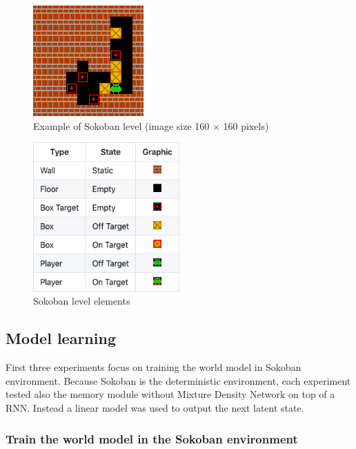 \begin{figure}[H]
\includegraphics[]{figures/Sokoban.png}
\caption[Sokoban]{Example of Sokoban level (image size 160 × 160 pixels)}
\label{Fig.Sokoban}
\end{figure}

\begin{figure}[H]
\includegraphics[width=0.5\textwidth,keepaspectratio]{figures/Sokoban_elements.png}
\caption[]{Sokoban level elements}
\label{Fig.Sokoban_elements}
\end{figure}

\subsection{Model learning}

First three experiments focus on training the world model in Sokoban environment. Because Sokoban is the deterministic environment, each experiment tested also the memory module without Mixture Density Network on top of a RNN. Instead a linear model was used to output the next latent state. 

\subsubsection{Train the world model in the Sokoban environment}

